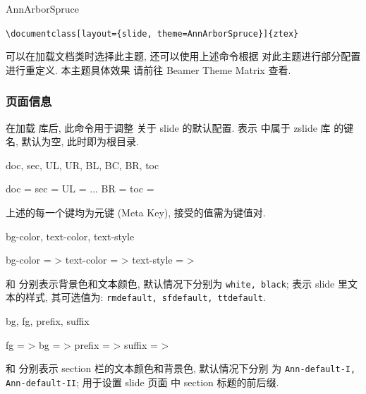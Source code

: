 \begin{function}[updated=2024-12-05]{AnnArborSpruce}
  \begin{syntax}
    \verb!\documentclass[layout={slide, theme=AnnArborSpruce}]{ztex}!
  \end{syntax}  
  可以在加载文档类时选择此主题, 还可以使用上述命令根据  对此主题进行部分配置进行重定义. 本主题具体效果
  请前往 Beamer Theme Matrix 查看.
\end{function}


\clearpage
\subsubsection{页面信息}
\begin{function}[updated=2025-04-25]{\zslideset}
  \begin{syntax}
  \end{syntax}
  在加载  库后, 此命令用于调整 \ztex{} 关于 slide 的默认配置.  表示 \ztex{} 中属于 zslide 库
  的键名, 默认为空, 此时即为根目录.
\end{function}


\begin{keyval}[parent=ztex/../zslide]{doc, sec, UL, UR, BL, BC, BR, toc}
  \begin{syntax}
    doc  = 
    sec  = 
    UL   = 
    ...
    BR   = 
    toc  = 
  \end{syntax}
  上述的每一个键均为元键 (Meta Key), 接受的值需为键值对.
\end{keyval}


\begin{keyval}[parent=ztex/../doc]{bg-color, text-color, text-style}
  \begin{syntax}
    bg-color   = >
    text-color = >
    text-style = >
  \end{syntax}
   和  分别表示背景色和文本颜色, 默认情况下分别为 \texttt{white, black}; 
   表示 slide 里文本的样式, 其可选值为: \texttt{rmdefault, sfdefault, ttdefault}.
\end{keyval}

\begin{keyval}[parent=ztex/../sec]{bg, fg, prefix, suffix}
  \begin{syntax}
    fg       = >
    bg       = >
    prefix   = >
    suffix   = >
  \end{syntax}
   和  分别表示 section 栏的文本颜色和背景色, 默认情况下分别
  为 \texttt{Ann-default-I, Ann-default-II};  用于设置 slide 页面
  中 section 标题的前后缀.
\end{keyval}


